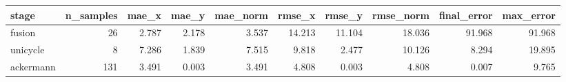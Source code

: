 \begin{tabular}{lrrrrrrrrr}
\hline
stage & n\_samples & mae\_x & mae\_y & mae\_norm & rmse\_x & rmse\_y & rmse\_norm & final\_error & max\_error \\
\hline
fusion & 26 & 2.787 & 2.178 & 3.537 & 14.213 & 11.104 & 18.036 & 91.968 & 91.968 \\
unicycle & 8 & 7.286 & 1.839 & 7.515 & 9.818 & 2.477 & 10.126 & 8.294 & 19.895 \\
ackermann & 131 & 3.491 & 0.003 & 3.491 & 4.808 & 0.003 & 4.808 & 0.007 & 9.765 \\
\hline
\end{tabular}